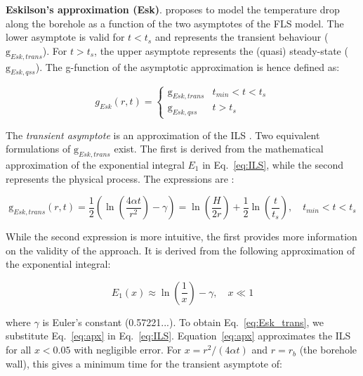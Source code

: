 \textbf{Eskilson's approximation (Esk)}.
\citet{eskilson_thermal_1987} proposes to model the temperature drop along the borehole as a function of the two asymptotes of the FLS model. The lower asymptote is valid for $t < t_s$ and represents the transient behaviour ($\mathrm{g}_{Esk, trans}$). For $t > t_s$, the upper asymptote represents the (quasi) steady-state ($\mathrm{g}_{Esk, qss}$). The g-function of the asymptotic approximation is hence defined as:

\begin{equation}
    g_{Esk}(r, t) = \left\{
        \begin{matrix}
            \mathrm{g}_{Esk, trans} & t_{min} < t < t_s   \\ 
            \mathrm{g}_{Esk, qss}    & t > t_s           
        \end{matrix} 
\right.
\end{equation}

The \textit{transient asymptote} is an approximation of the ILS \citep{wagner_erdwarmesonden._2019}. Two equivalent formulations of $\mathrm{g}_{Esk, trans}$ exist. The first is derived from the mathematical approximation of the exponential integral $E_1$ in Eq.~\ref{eq:ILS}, while the second represents the physical process. The expressions are \citep{pahud_geothermal_2002}: 

\begin{equation}
\label{eq:Esk_trans}
    \mathrm{g}_{Esk, trans}(r, t) = \frac{1}{2} \left(\ln\left(\frac{4 \alpha t}{r^2}\right) - \gamma\right)
                                  = \ln\left(\frac{H}{2 r}\right) + \frac{1}{2} \ln\left(\frac{t}{t_s}\right), \quad
    t_{min} < t < t_s
\end{equation}

While the second expression is more intuitive, the first provides more information on the validity of the approach. It is derived from the following approximation of the exponential integral:

\begin{equation}
\label{eq:apx}
    E_1\left(x\right) \approx \ln\left(\frac{1}{x}\right) - \gamma, \quad x \ll 1
\end{equation}

where $\gamma$ is Euler's constant (0.57221...). To obtain Eq.~\ref{eq:Esk_trans}, we substitute Eq.~\ref{eq:apx} in Eq.~\ref{eq:ILS}.
Equation~\ref{eq:apx} approximates the ILS for all $x < 0.05$ with negligible error. For $x = r^2/(4 \alpha t)$ and $r = r_b$ (the borehole wall), this gives a minimum time for the transient asymptote of:

